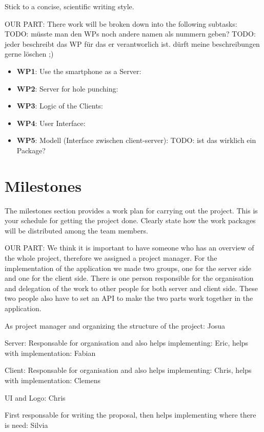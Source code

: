 \documentclass{report}
\begin{document}
Stick to a concise, scientific writing style. 

OUR PART:
There work will be broken down into the following subtasks:
TODO: müsste man den WPs noch andere namen als nummern geben?
TODO: jeder beschreibt das WP für das er verantworlich ist. dürft meine beschreibungen gerne löschen ;)
\begin{itemize}
        \item {\bf WP1}: Use the smartphone as a Server:   
        \item {\bf WP2}: Server for hole punching:   
        \item {\bf WP3}: Logic of the Clients: 
        \item {\bf WP4}: User Interface: 
        \item {\bf WP5}:  Modell (Interface zwischen client-server): TODO: ist das wirklich ein Package?
\end{itemize}

\section{Milestones}
The milestones section provides a work plan for carrying out the project.
This is your schedule for getting the project done.
Clearly state how the work packages will be distributed among the team members. 


OUR PART:
We think it is important to have someone who has an overview of the whole project, therefore we assigned a project manager. For the implementation of the application we made two groups, one for the server side and one for the client side. There is one person responsible for the organisation and delegation of the work to other people for both server and client side. These two people also have to set an API to make the two parts work together in the application.

As project manager and organizing the structure of the project: Josua

Server: Responsable for organisation and also helps implementing: Eric, helps with implementation: Fabian

Client: Responsable for organisation and also helps implementing: Chris, helps with implementation: Clemens

UI and Logo: Chris

First responsable for writing the proposal, then helps implementing where there is need: Silvia




\end{document}
